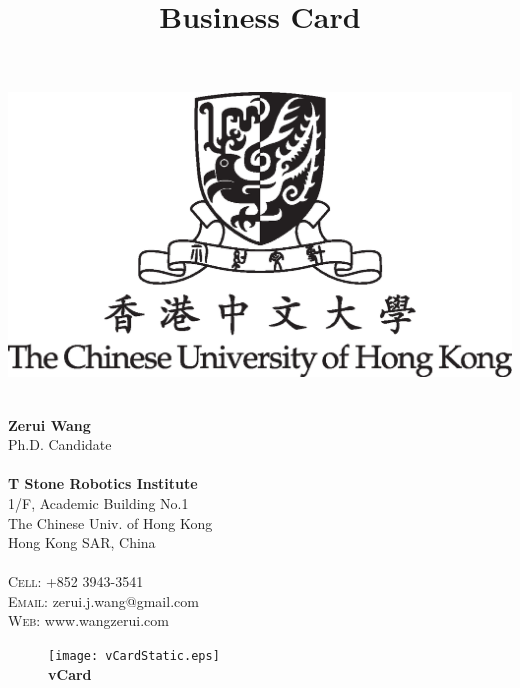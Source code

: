 \documentclass[11pt,a4paper]{memoir}
\title{Business Card}
\makeatletter
\def\Who     {Zerui Wang}
\def\CityZip {Hong Kong SAR, China}
\def\Email   {zerui.j.wang@gmail.com}
\def\TEL     {+852 3943-3541}
\def\WEB     {www.wangzerui.com}
\makeatother
\begin{document}

\begin{Spacing}{}
\noindent
\tiny
\hspace{2.7mm}
\begin{minipage}{0.42\textwidth}
\begin{center}
\includegraphics[width=1.0\linewidth]{cuhk_centre_logo}
\end{center}
\end{minipage}
%
\hspace{5.0mm}
%
\begin{minipage}{0.55\textwidth}
\vspace{0.6em}
\hspace{0.1em} \\
\textbf{\Who} \\
Ph.D. Candidate \\ 
\vspace{1em} \\
\textbf{T Stone Robotics Institute} \\
1/F, Academic Building No.1 \\
The Chinese Univ. of Hong Kong \\
\CityZip\\
\vspace{1em} \\
\textsc{Cell:} \hspace{0em} \TEL \\
\textsc{Email:} \Email \\
\textsc{Web:} \hspace{0.25em} \WEB \\
\end{minipage}
\end{Spacing}

\newpage

\begin{figure}
\tiny
\centering
\texttt{[image: vCardStatic.eps]}\\
\vspace{-2mm}
\textbf{vCard}
\end{figure}
\end{document}
